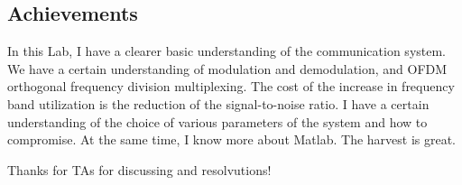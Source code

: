 \documentclass{article}
\begin{document}
\subsection{Achievements}
In this Lab, I have a clearer basic understanding of the communication system. We have a certain understanding of modulation and demodulation, and OFDM orthogonal frequency division multiplexing. The cost of the increase in frequency band utilization is the reduction of the signal-to-noise ratio. I have a certain understanding of the choice of various parameters of the system and how to compromise. At the same time, I know more about Matlab. The harvest is great.

Thanks for TAs for discussing and resolvutions!



\end{document}
